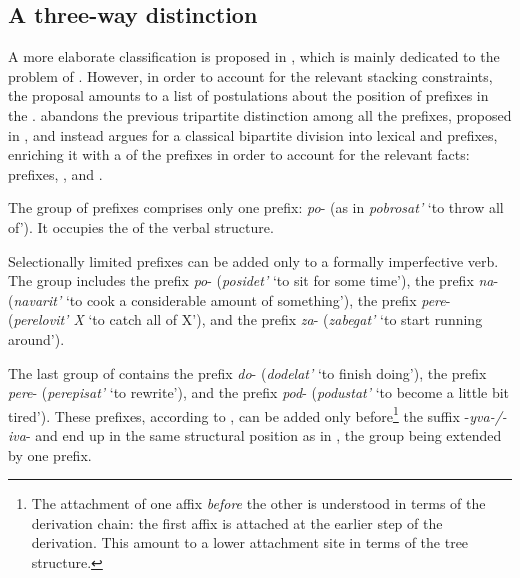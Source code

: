 \subsection{A three-way distinction}\label{section:Tat09}
A more elaborate classification is proposed in \citealt{Tatevosov:09}, which is mainly dedicated to the problem of . However, in order to account for the relevant stacking constraints, the proposal amounts to a list of postulations about the position of prefixes in the . \citet{Tatevosov:09} abandons the previous tripartite distinction among all the prefixes, proposed in \citet{Tatevosov:07}, and instead argues for a classical bipartite division into lexical and  prefixes, enriching it with a  of the  prefixes in order to account for the relevant facts:  prefixes, , and .

The group of  prefixes comprises only one prefix:  \textit{po}- (as in \textit{pobrosat'} `to throw all of'). It occupies the  of the verbal structure.

Selectionally limited prefixes can be added only to a formally imperfective verb. The group includes the  prefix \textit{po}- (\textit{posidet'} `to sit for some time'), the  prefix \textit{na}- (\textit{navarit'} `to cook a considerable amount of something'), the  prefix \textit{pere}- (\textit{perelovit' X} `to catch all of X'), and the  prefix \textit{za}- (\textit{zabegat'} `to start running around').

The last group of  contains the  prefix \textit{do}- (\textit{dodelat'} `to finish doing'), the  prefix \textit{pere}- (\textit{perepisat'} `to rewrite'), and the  prefix \textit{pod}- (\textit{podustat'} `to become a little bit tired'). These prefixes, according to \citet{Tatevosov:09}, can be added only before\footnote{The attachment of one affix \textit{before} the other is understood in terms of the derivation chain: the first affix is attached at the earlier step of the derivation. This amount to a lower attachment site in terms of the tree structure.} the  suffix -\textit{yva-/-iva}- and end up in the same structural position as  in \citet{Tatevosov:07}, the group being extended by one prefix.
	

